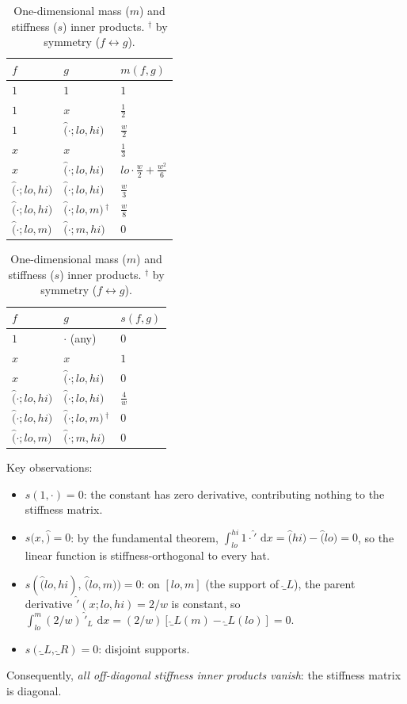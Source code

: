 \documentclass[11pt]{article}
\newcommand{\dd}{\,\mathrm{d}}
\begin{document}
\begin{table}[h]
\centering
\caption{One-dimensional mass ($m$) and stiffness ($s$) inner products.
${}^\dagger$ by symmetry ($f \leftrightarrow g$).}
\label{tab:1d-inners}
\renewcommand{\arraystretch}{1.35}
\begin{tabular}{ll@{\quad}l}
\toprule
$f$ & $g$ & $m(f,g)$ \\
\midrule
$1$                  & $1$                  & $1$ \\
$1$                  & $x$                  & $\tfrac{1}{2}$ \\
$1$                  & $\hat(\cdot;lo,hi)$  & $\tfrac{w}{2}$ \\
$x$                  & $x$                  & $\tfrac{1}{3}$ \\
$x$                  & $\hat(\cdot;lo,hi)$  & $lo\cdot\tfrac{w}{2} + \tfrac{w^2}{6}$ \\
$\hat(\cdot;lo,hi)$  & $\hat(\cdot;lo,hi)$  & $\tfrac{w}{3}$ \\
$\hat(\cdot;lo,hi)$  & $\hat(\cdot;lo,m)$\,${}^\dagger$
                                             & $\tfrac{w}{8}$ \\
$\hat(\cdot;lo,m)$   & $\hat(\cdot;m,hi)$   & $0$ \\
\bottomrule
\end{tabular}
\qquad
\begin{tabular}{ll@{\quad}l}
\toprule
$f$ & $g$ & $s(f,g)$ \\
\midrule
$1$                  & $\cdot$ (any)         & $0$ \\
$x$                  & $x$                   & $1$ \\
$x$                  & $\hat(\cdot;lo,hi)$   & $0$ \\
$\hat(\cdot;lo,hi)$  & $\hat(\cdot;lo,hi)$   & $\tfrac{4}{w}$ \\
$\hat(\cdot;lo,hi)$  & $\hat(\cdot;lo,m)$\,${}^\dagger$
                                              & $0$ \\
$\hat(\cdot;lo,m)$   & $\hat(\cdot;m,hi)$    & $0$ \\
\bottomrule
\end{tabular}
\end{table}

\noindent
Key observations:
\begin{itemize}
  \item $s(1,\cdot) = 0$: the constant has zero derivative, contributing
        nothing to the stiffness matrix.
  \item $s(x, \hat) = 0$: by the fundamental theorem,
        $\int_{lo}^{hi} 1 \cdot \hat'\,\dd x = \hat(hi) - \hat(lo) = 0$,
        so the linear function is stiffness-orthogonal to every hat.
  \item $s(\hat(lo,hi),\,\hat(lo,m)) = 0$: on $[lo,m]$ (the support of
        $\hat_L$), the parent derivative $\hat'(x;lo,hi) = 2/w$ is constant,
        so $\int_{lo}^m (2/w)\,\hat'_L\,\dd x = (2/w)[\hat_L(m)-\hat_L(lo)]
        = 0$.
  \item $s(\hat_L,\hat_R) = 0$: disjoint supports.
\end{itemize}
Consequently, \emph{all off-diagonal stiffness inner products vanish}: the
stiffness matrix is diagonal.
\end{document}
